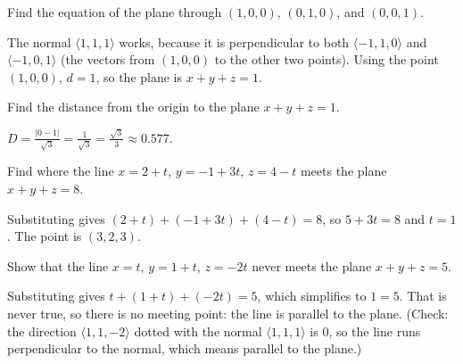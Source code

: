 \begin{Exercise}[label=lp2, title=Equation of a plane]
Find the equation of the plane through $(1, 0, 0)$, $(0, 1, 0)$, and $(0, 0, 1)$.
\end{Exercise}
\begin{Answer}[ref=lp2]
The normal $\langle 1, 1, 1\rangle$ works, because it is perpendicular to both
$\langle -1, 1, 0\rangle$ and $\langle -1, 0, 1\rangle$ (the vectors from $(1,0,0)$ to the other two points).
Using the point $(1, 0, 0)$, $d = 1$, so the plane is $x + y + z = 1$.
\end{Answer}

\begin{Exercise}[label=lp3, title=Distance to a plane]
Find the distance from the origin to the plane $x + y + z = 1$.
\end{Exercise}
\begin{Answer}[ref=lp3]
$D = \frac{|0 - 1|}{\sqrt{3}} = \frac{1}{\sqrt{3}} = \frac{\sqrt{3}}{3} \approx 0.577$.
\end{Answer}

\begin{Exercise}[label=lp4, title=Line meets a plane]
Find where the line $x = 2 + t$, $y = -1 + 3t$, $z = 4 - t$ meets the plane $x + y + z = 8$.
\end{Exercise}
\begin{Answer}[ref=lp4]
Substituting gives $(2 + t) + (-1 + 3t) + (4 - t) = 8$, so $5 + 3t = 8$ and $t = 1$. The point is $(3, 2, 3)$.
\end{Answer}

\begin{Exercise}[label=lp5, title=A line that misses]
Show that the line $x = t$, $y = 1 + t$, $z = -2t$ never meets the plane
$x + y + z = 5$.
\end{Exercise}
\begin{Answer}[ref=lp5]
Substituting gives $t + (1 + t) + (-2t) = 5$, which simplifies to $1 = 5$.
That is never true, so there is no meeting point: the line is parallel to
the plane. (Check: the direction $\langle 1, 1, -2\rangle$ dotted with the
normal $\langle 1, 1, 1\rangle$ is $0$, so the line runs perpendicular to
the normal, which means parallel to the plane.)
\end{Answer}
